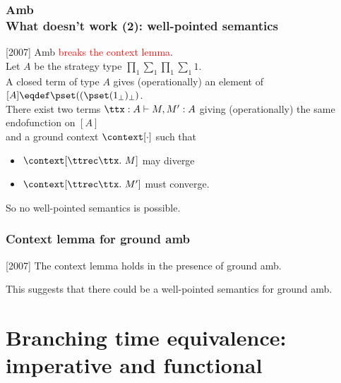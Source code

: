 \documentclass{beamer}
\newcommand{\red}[1]{\textcolor{red}{#1}}
\begin{document}
\begin{frame}\frametitle{Amb \\ What doesn't work (2): well-pointed semantics}
  
[2007] Amb \red{breaks the context lemma}. \\
\medskip
Let $A$ be the strategy type $\prod_{1} \sum_{1} \prod_{1} \sum_{1} 1$.   \\
\medskip
A closed term of type $A$ gives (operationally) an element of $[A] \eqdef \pset ((\pset (1_{\bot})_{\bot})$. \\
\pause \medskip
There exist two terms $\ttx:A \vdash M,M':A$ giving (operationally) the same endofunction on $[A]$ \\
\medskip
and a ground context $\context[\cdot]$ such that
\begin{itemize}
\item $\context[\ttrec \ttx.\ M]$ may diverge
\item $\context[\ttrec \ttx.\ M']$ must converge.
\end{itemize}
\medskip
So no well-pointed semantics is possible.  

\end{frame}

\begin{frame}\frametitle{Context lemma for ground amb}

[2007] The context lemma holds in the presence of ground amb. \\
\medskip

This suggests that there could be a well-pointed semantics for ground amb.

\end{frame}

\section{Branching time equivalence: imperative and functional}
\end{document}

